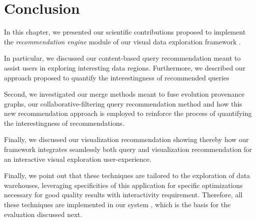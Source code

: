  \section{Conclusion}
 
% 
 

In this chapter, we presented our scientific contributions proposed to implement the \emph{recommendation engine} module of our visual data exploration framework \framework{}.

In particular, we discussed our content-based query recommendation meant to assist users in exploring interesting data regions.
Furthermore, we described our approach proposed to quantify the interestingness of recommended queries

Second, we investigated our merge methods meant to fuse evolution provenance graphs, our collaborative-filtering query recommendation method and how this new recommendation approach is employed to reinforce the process of quantifying the interestingness of recommendations.

Finally, we discussed our visualization recommendation showing thereby how our framework \framework{} integrates seamlessly both query and visualization recommendation for an interactive visual exploration user-experience.


Finally, we point out that these techniques are tailored to the exploration of data warehouses, leveraging specificities of this application for specific optimizations necessary for good quality results with interactivity requirement. Therefore, all these techniques are implemented in our system \prototype{}, which is the basis for the evaluation discussed next.




